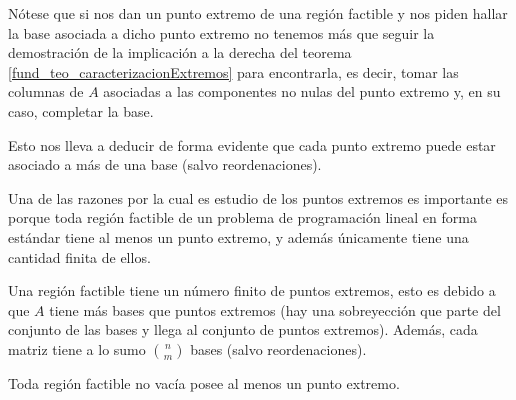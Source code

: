\begin{obs}
	Nótese que si nos dan un punto extremo de una región factible y nos piden hallar la base asociada a dicho punto extremo no tenemos más que seguir la demostración de la implicación a la derecha del teorema \ref{fund_teo_caracterizacionExtremos} para encontrarla, es decir, tomar las columnas de $A$ asociadas a las componentes no nulas del punto extremo y, en su caso, completar la base.
	
	Esto nos lleva a deducir de forma evidente que cada punto extremo puede estar asociado a más de una base (salvo reordenaciones).
\end{obs}
Una de las razones por la cual es estudio de los puntos extremos es importante es porque toda región factible de un problema de programación lineal en forma estándar tiene al menos un punto extremo, y además únicamente tiene una cantidad finita de ellos.
\begin{obs}[Finitud]
	\label{fund_obs_finitudExtremos}
	Una región factible tiene un número finito de puntos extremos, esto es debido a que $A$ tiene más bases que puntos extremos (hay una sobreyección que parte del conjunto de las bases y llega al conjunto de puntos extremos). Además, cada matriz tiene a lo sumo $\binom{n}{m}$ bases (salvo reordenaciones).
\end{obs}
\begin{theo}[Existencia]
	\label{fund_teo_existenciaExtremos}
	Toda región factible no vacía posee al menos un punto extremo.
\end{theo}
